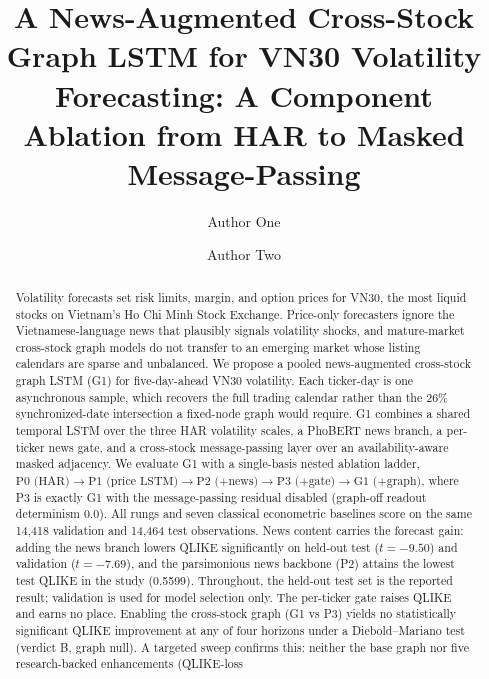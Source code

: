 \documentclass[runningheads]{llncs}
\newcommand{\PtwoTestQ}{0.5599}  %
\newcommand{\newsValT}{-7.69}
\newcommand{\newsTestT}{-9.50}
\newcommand{\nval}{14{,}418}
\newcommand{\ntest}{14{,}464}
\begin{document}
%
\title{A News-Augmented Cross-Stock Graph LSTM for VN30 Volatility Forecasting: A Component Ablation from HAR to Masked Message-Passing}
%
%
\author{Author One \and Author Two}
%
%
\maketitle
%
\begin{abstract}
Volatility forecasts set risk limits, margin, and option prices for VN30, the most liquid stocks on
Vietnam's Ho Chi Minh Stock Exchange. Price-only forecasters ignore the Vietnamese-language news that
plausibly signals volatility shocks, and mature-market cross-stock graph models do not transfer to an
emerging market whose listing calendars are sparse and unbalanced. We propose a pooled news-augmented
cross-stock graph LSTM (G1) for five-day-ahead VN30 volatility. Each ticker-day is one asynchronous
sample, which recovers the full trading calendar rather than the 26\% synchronized-date intersection a
fixed-node graph would require. G1 combines a shared temporal LSTM over the three HAR volatility scales,
a PhoBERT news branch, a per-ticker news gate, and a cross-stock message-passing layer over an
availability-aware masked adjacency. We evaluate G1 with a single-basis nested ablation ladder,
$\text{P0 (HAR)}\to\text{P1 (price LSTM)}\to\text{P2 (+news)}\to\text{P3 (+gate)}\to\text{G1 (+graph)}$,
where P3 is exactly G1 with the message-passing residual disabled (graph-off readout determinism $0.0$).
All rungs and seven classical econometric baselines score on the same \nval{} validation and \ntest{}
test observations. News content carries the forecast gain: adding the news branch lowers QLIKE
significantly on held-out test ($t=\newsTestT$) and validation ($t=\newsValT$), and the parsimonious
news backbone (P2) attains the lowest test QLIKE in the study (\PtwoTestQ). Throughout, the held-out
test set is the reported result; validation is used for model selection only. The per-ticker gate raises
QLIKE and earns no place. Enabling the cross-stock graph (G1 vs P3) yields no statistically significant
QLIKE improvement at any of four horizons under a Diebold--Mariano test (verdict B, graph null). A
targeted sweep confirms this: neither the base graph nor five research-backed enhancements (QLIKE-loss

\end{abstract}
\end{document}
